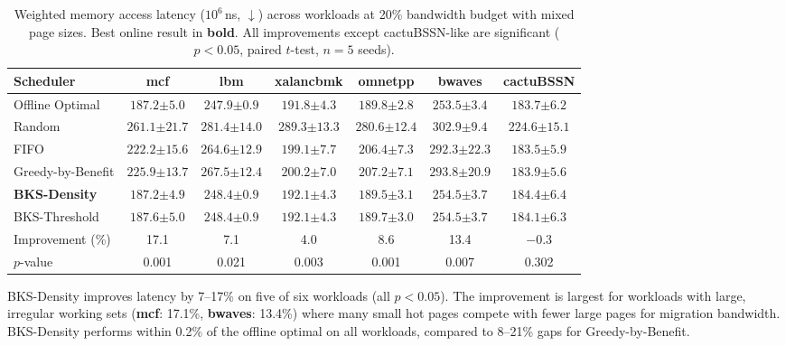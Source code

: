 \documentclass{article}
\begin{document}
\begin{table}[t]
\caption{Weighted memory access latency ($10^6$\,ns, $\downarrow$) across workloads at 20\% bandwidth budget with mixed page sizes. Best online result in \textbf{bold}. All improvements except cactuBSSN-like are significant ($p < 0.05$, paired $t$-test, $n=5$ seeds).}
\label{tab:main}
\centering
\small
\begin{tabular}{lcccccc}
\toprule
Scheduler & mcf & lbm & xalancbmk & omnetpp & bwaves & cactuBSSN \\
\midrule
Offline Optimal & $187.2{\scriptstyle\pm5.0}$ & $247.9{\scriptstyle\pm0.9}$ & $191.8{\scriptstyle\pm4.3}$ & $189.8{\scriptstyle\pm2.8}$ & $253.5{\scriptstyle\pm3.4}$ & $183.7{\scriptstyle\pm6.2}$ \\
Random & $261.1{\scriptstyle\pm21.7}$ & $281.4{\scriptstyle\pm14.0}$ & $289.3{\scriptstyle\pm13.3}$ & $280.6{\scriptstyle\pm12.4}$ & $302.9{\scriptstyle\pm9.4}$ & $224.6{\scriptstyle\pm15.1}$ \\
FIFO & $222.2{\scriptstyle\pm15.6}$ & $264.6{\scriptstyle\pm12.9}$ & $199.1{\scriptstyle\pm7.7}$ & $206.4{\scriptstyle\pm7.3}$ & $292.3{\scriptstyle\pm22.3}$ & $183.5{\scriptstyle\pm5.9}$ \\
Greedy-by-Benefit & $225.9{\scriptstyle\pm13.7}$ & $267.5{\scriptstyle\pm12.4}$ & $200.2{\scriptstyle\pm7.0}$ & $207.2{\scriptstyle\pm7.1}$ & $293.8{\scriptstyle\pm20.9}$ & $183.9{\scriptstyle\pm5.6}$ \\
\textbf{BKS-Density} & $\mathbf{187.2}{\scriptstyle\pm4.9}$ & $\mathbf{248.4}{\scriptstyle\pm0.9}$ & $\mathbf{192.1}{\scriptstyle\pm4.3}$ & $\mathbf{189.5}{\scriptstyle\pm3.1}$ & $\mathbf{254.5}{\scriptstyle\pm3.7}$ & $184.4{\scriptstyle\pm6.4}$ \\
BKS-Threshold & $187.6{\scriptstyle\pm5.0}$ & $248.4{\scriptstyle\pm0.9}$ & $192.1{\scriptstyle\pm4.3}$ & $189.7{\scriptstyle\pm3.0}$ & $254.5{\scriptstyle\pm3.7}$ & $\mathbf{184.1}{\scriptstyle\pm6.3}$ \\
\midrule
Improvement (\%) & 17.1 & 7.1 & 4.0 & 8.6 & 13.4 & $-0.3$ \\
$p$-value & 0.001 & 0.021 & 0.003 & 0.001 & 0.007 & 0.302 \\
\bottomrule
\end{tabular}
\end{table}

BKS-Density improves latency by 7--17\% on five of six workloads (all $p < 0.05$). The improvement is largest for workloads with large, irregular working sets (\textbf{mcf}: 17.1\%, \textbf{bwaves}: 13.4\%) where many small hot pages compete with fewer large pages for migration bandwidth. BKS-Density performs within 0.2\% of the offline optimal on all workloads, compared to 8--21\% gaps for Greedy-by-Benefit.
\end{document}

